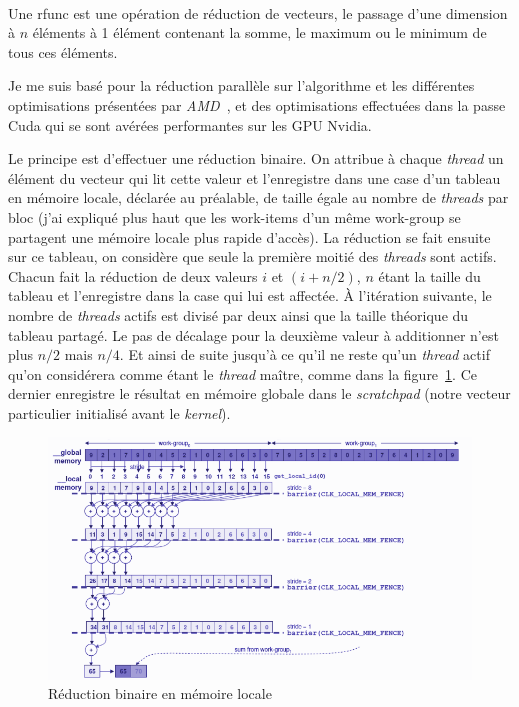 \paragraph{}
Une rfunc est une opération de réduction de vecteurs, le passage d'une dimension
à $n$ éléments à 1 élément contenant la somme, le maximum ou le minimum de tous
ces éléments.

Je me suis basé pour la réduction parallèle sur l'algorithme et les différentes
optimisations présentées par \emph{AMD}~\cite{ocl_reduction}, et des
optimisations effectuées dans la passe Cuda qui se sont avérées performantes sur
les GPU Nvidia.

Le principe est d'effectuer une réduction binaire. On attribue à chaque
\emph{thread} un élément du vecteur qui lit cette valeur et l'enregistre dans
une case d'un tableau en mémoire locale, déclarée au préalable, de taille égale
au nombre de \emph{threads} par bloc (j'ai expliqué plus haut que les work-items
d'un même work-group se partagent une mémoire locale plus rapide d'accès). La
réduction se fait ensuite sur ce tableau, on considère que seule la première
moitié des \emph{threads} sont actifs. Chacun fait la réduction de deux valeurs
$i$ et $(i+n/2)$, $n$ étant la taille du tableau et l'enregistre dans la case
qui lui est affectée. À l'itération suivante, le nombre de \emph{threads} actifs
est divisé par deux ainsi que la taille théorique du tableau partagé. Le pas de
décalage pour la deuxième valeur à additionner n'est plus $n/2$ mais $n/4$. Et
ainsi de suite jusqu'à ce qu'il ne reste qu'un \emph{thread} actif qu'on
considérera comme étant le \emph{thread} maître, comme dans la
figure~\ref{binary_sum}. Ce dernier enregistre le résultat en mémoire globale
dans le \emph{scratchpad} (notre vecteur particulier initialisé avant le
\emph{kernel}).

\begin{figure}[h]
   \begin{center}
      \includegraphics[scale=0.75]{./images/binary_reduce.png}
   \end{center}
   \caption{Réduction binaire en mémoire locale~\cite{binary_sum}}
   \label{binary_sum}
\end{figure}

